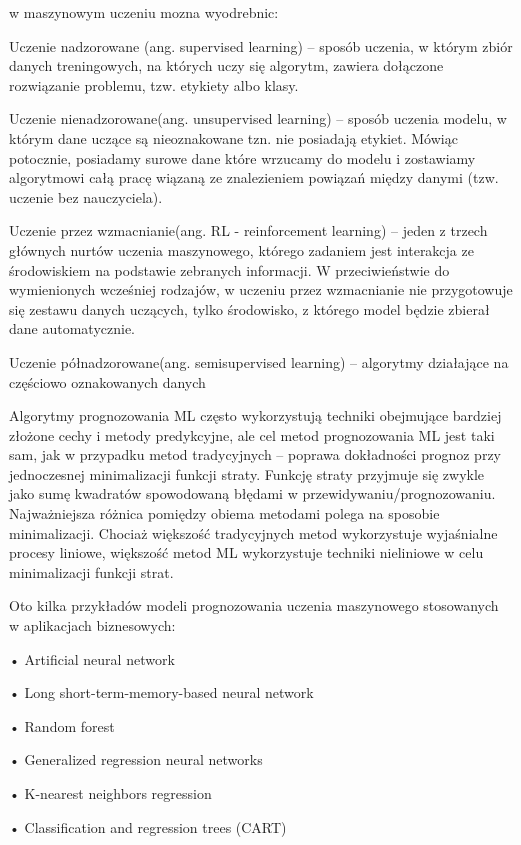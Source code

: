  w maszynowym uczeniu mozna wyodrebnic:
 
Uczenie nadzorowane (ang. supervised learning) – sposób uczenia, w którym zbiór danych treningowych, na których uczy się algorytm, zawiera dołączone rozwiązanie problemu, tzw. etykiety albo klasy. 

Uczenie nienadzorowane(ang. unsupervised learning) – sposób uczenia modelu, w którym dane uczące są nieoznakowane tzn. nie posiadają etykiet. Mówiąc potocznie, posiadamy surowe dane które wrzucamy do modelu i zostawiamy algorytmowi całą pracę wiązaną ze znalezieniem powiązań między danymi (tzw. uczenie bez nauczyciela).

Uczenie przez wzmacnianie(ang. RL - reinforcement learning) – jeden z trzech głównych nurtów uczenia maszynowego, którego zadaniem jest interakcja ze środowiskiem na podstawie zebranych informacji. W przeciwieństwie do wymienionych wcześniej rodzajów, w uczeniu przez wzmacnianie nie przygotowuje się zestawu danych uczących, tylko środowisko, z którego model będzie zbierał dane automatycznie. 

  Uczenie półnadzorowane(ang. semisupervised learning) – algorytmy działające na częściowo oznakowanych danych\cite{gove2023}

 Algorytmy prognozowania ML często wykorzystują techniki obejmujące bardziej złożone cechy i metody predykcyjne, ale cel metod prognozowania ML jest taki sam, jak w przypadku metod tradycyjnych – poprawa dokładności prognoz przy jednoczesnej minimalizacji funkcji straty. Funkcję straty przyjmuje się zwykle jako sumę kwadratów spowodowaną błędami w przewidywaniu/prognozowaniu. Najważniejsza różnica pomiędzy obiema metodami polega na sposobie minimalizacji. Chociaż większość tradycyjnych metod wykorzystuje wyjaśnialne procesy liniowe, większość metod ML wykorzystuje techniki nieliniowe w celu minimalizacji funkcji strat. 



Oto kilka przykładów modeli prognozowania uczenia maszynowego stosowanych w aplikacjach biznesowych:

    • Artificial neural network
    
    • Long short-term-memory-based neural network
    
    • Random forest
    
    • Generalized regression neural networks
    
    • K-nearest neighbors regression
    
    • Classification and regression trees (CART)
    
